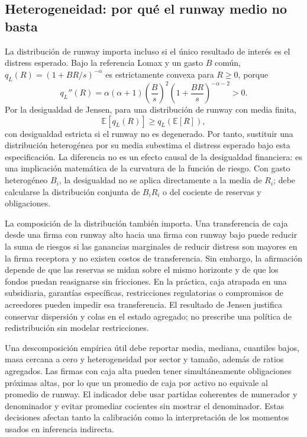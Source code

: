 \documentclass[11pt,a4paper]{article}
\begin{document}
\subsection{Heterogeneidad: por qué el runway medio no basta}
La distribución de runway importa incluso si el único resultado de interés es el distress esperado. Bajo la referencia Lomax y un gasto $B$ común, $q_L(R)=(1+BR/s)^{-\alpha}$ es estrictamente convexa para $R\geq0$, porque
\begin{equation}
q_L''(R)=\alpha(\alpha+1)\left(\frac{B}{s}\right)^2\left(1+\frac{BR}{s}\right)^{-\alpha-2}>0.
\end{equation}
Por la desigualdad de Jensen, para una distribución de runway con media finita,
\begin{equation}
\mathbb E[q_L(R)]\geq q_L(\mathbb E[R]),
\label{eq:jensen_distress}
\end{equation}
con desigualdad estricta si el runway no es degenerado. Por tanto, sustituir una distribución heterogénea por su media subestima el distress esperado bajo esta especificación. La diferencia no es un efecto causal de la desigualdad financiera: es una implicación matemática de la curvatura de la función de riesgo. Con gasto heterogéneo $B_i$, la desigualdad no se aplica directamente a la media de $R_i$; debe calcularse la distribución conjunta de $B_iR_i$ o del cociente de reservas y obligaciones.

La composición de la distribución también importa. Una transferencia de caja desde una firma con runway alto hacia una firma con runway bajo puede reducir la suma de riesgos si las ganancias marginales de reducir distress son mayores en la firma receptora y no existen costos de transferencia. Sin embargo, la afirmación depende de que las reservas se midan sobre el mismo horizonte y de que los fondos puedan reasignarse sin fricciones. En la práctica, caja atrapada en una subsidiaria, garantías específicas, restricciones regulatorias o compromisos de acreedores pueden impedir esa transferencia. El resultado de Jensen justifica conservar dispersión y colas en el estado agregado; no prescribe una política de redistribución sin modelar restricciones.

Una descomposición empírica útil debe reportar media, mediana, cuantiles bajos, masa cercana a cero y heterogeneidad por sector y tamaño, además de ratios agregados. Las firmas con caja alta pueden tener simultáneamente obligaciones próximas altas, por lo que un promedio de caja por activo no equivale al promedio de runway. El indicador debe usar partidas coherentes de numerador y denominador y evitar promediar cocientes sin mostrar el denominador. Estas decisiones afectan tanto la calibración como la interpretación de los momentos usados en inferencia indirecta.
\end{document}
